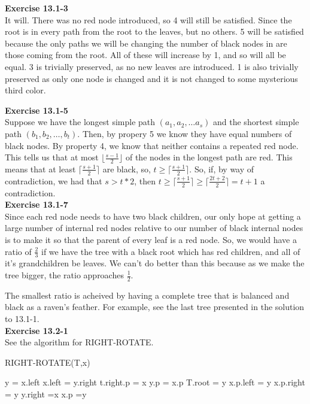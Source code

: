 \documentclass{article}
\begin{document}
\noindent\textbf{ Exercise 13.1-3} \\
It will. There was no red node introduced, so 4 will still be satisfied. Since the root is in every path from the root to the leaves, but no others. 5 will be satisfied because the only paths we will be changing the number of black nodes in are those coming from the root. All of these will increase by 1, and so will all be equal. 3 is trivially preserved, as no new leaves are introduced. 1 is also trivially preserved as only one node is changed and it is not changed to some mysterious third color.\

\noindent\textbf{ Exercise 13.1-5} \\
Suppose we have the longest simple path $(a_1,a_2,\ldots a_s)$ and the shortest simple path $(b_1,b_2, \ldots, b_t)$. Then, by propery 5 we know they have equal numbers of black nodes. By property 4, we know that neither contains a repeated red node. This tells us that at most $\lfloor\frac{s-1}{2}\rfloor$ of the nodes in the longest path are red. This means that at least $\lceil \frac{s+1}{2} \rceil$ are black, so, $t\ge \lceil \frac{s+1}{2} \rceil$. So, if, by way of contradiction, we had that $s>t*2$, then $  t \ge \lceil \frac{s+1}{2} \rceil \ge \lceil\frac{2t+2}{2} \rceil = t+1$ a contradiction.\\


\noindent\textbf{ Exercise 13.1-7} \\
Since each red node needs to have two black children, our only hope at getting a large number of internal red nodes relative to our number of black internal nodes is to make it so that the parent of every leaf is a red node. So, we would have a ratio of $\frac{2}{3}$ if we have the tree with a black root which has red children, and all of it's grandchildren be leaves. We can't do better than this because as we make the tree bigger, the ratio approaches $\frac{1}{2}$.

The smallest ratio is acheived by having a complete tree that is balanced and black as a raven's feather. For example, see the last tree presented in the solution to 13.1-1. \\

\noindent\textbf{ Exercise 13.2-1} \\
See the algorithm for RIGHT-ROTATE.\\


\begin{algorithm}
\caption{RIGHT-ROTATE(T,x)}
\begin{algorithmic}
\State y = x.left
\State x.left = y.right
\State t.right.p = x
\EndIf
\State y.p = x.p
\State T.root = y
\State x.p.left = y
\Else
\State x.p.right = y
\EndIf
\State y.right =x
\State x.p =y
\end{algorithmic}
\end{algorithm}
\end{document}
